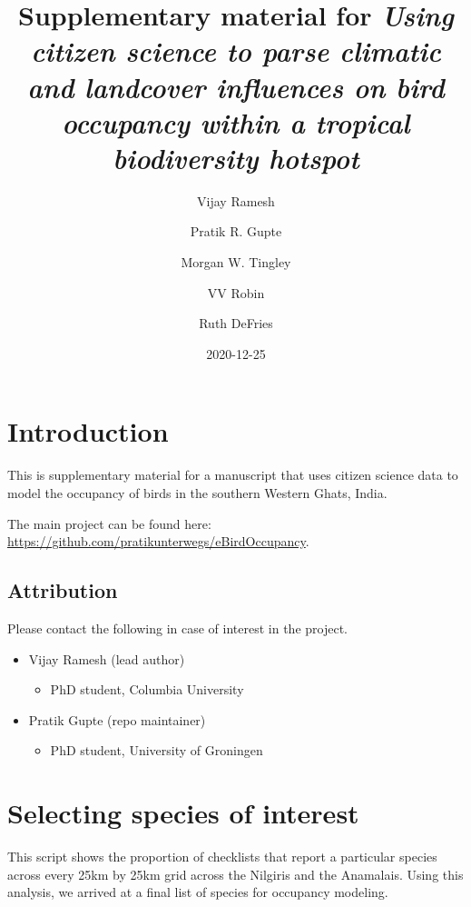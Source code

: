 \documentclass[]{article}
\title{Supplementary material for \emph{Using citizen science to parse climatic and landcover influences on bird occupancy within a tropical biodiversity hotspot}}
\author{Vijay Ramesh \and Pratik R. Gupte \and Morgan W. Tingley \and VV Robin \and Ruth DeFries}
\date{2020-12-25}
\providecommand{\tightlist}{%
  \setlength{\itemsep}{0pt}\setlength{\parskip}{0pt}}
\begin{document}
\maketitle


\linenumbers

{
\setcounter{tocdepth}{2}
\tableofcontents
}
\hypertarget{introduction}{%
\section{Introduction}\label{introduction}}

This is supplementary material for a manuscript that uses citizen science data to model the occupancy of birds in the southern Western Ghats, India.

The main project can be found here: \url{https://github.com/pratikunterwegs/eBirdOccupancy}.

\hypertarget{attribution}{%
\subsection{Attribution}\label{attribution}}

Please contact the following in case of interest in the project.

\begin{itemize}
\tightlist
\item
  Vijay Ramesh (lead author)

  \begin{itemize}
  \tightlist
  \item
    PhD student, Columbia University
  \end{itemize}
\item
  Pratik Gupte (repo maintainer)

  \begin{itemize}
  \tightlist
  \item
    PhD student, University of Groningen
  \end{itemize}
\end{itemize}

\hypertarget{selecting-species-of-interest}{%
\section{Selecting species of interest}\label{selecting-species-of-interest}}

This script shows the proportion of checklists that report a particular species across every 25km by 25km grid across the Nilgiris and the Anamalais. Using this analysis, we arrived at a final list of species for occupancy modeling.
\end{document}
